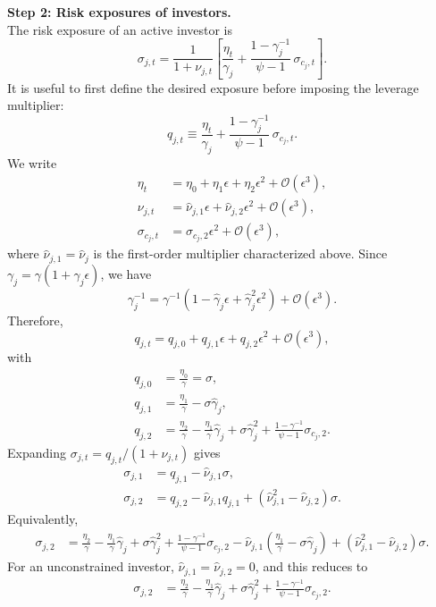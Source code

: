 \noindent\textbf{Step 2: Risk exposures of investors.}\\
The risk exposure of an active investor is
\begin{equation}
    \sigma_{j,t}
    = \frac{1}{1+\nu_{j,t}} \left[ \frac{\eta_t}{\gamma_j} + \frac{1-\gamma_j^{-1}}{\psi-1} \, \sigma_{c_j,t} \right].
\end{equation}
It is useful to first define the desired exposure before imposing the leverage multiplier:
\begin{equation}
    q_{j,t}
    \equiv \frac{\eta_t}{\gamma_j} + \frac{1-\gamma_j^{-1}}{\psi-1} \, \sigma_{c_j,t}.
\end{equation}
We write
\begin{align}
    \eta_t &= \eta_0 + \eta_1 \epsilon + \eta_2 \epsilon^2 + \mathcal{O}(\epsilon^3),\\
    \nu_{j,t} &= \hat{\nu}_{j,1}\epsilon + \hat{\nu}_{j,2}\epsilon^2 + \mathcal{O}(\epsilon^3),\\
    \sigma_{c_j,t} &= \sigma_{c_j,2}\epsilon^2 + \mathcal{O}(\epsilon^3),
\end{align}
where $\hat{\nu}_{j,1}=\hat{\nu}_j$ is the first-order multiplier characterized above.
Since $\gamma_j=\gamma(1+\hat{\gamma}_j\epsilon)$, we have
\begin{equation}
    \gamma_j^{-1}=\gamma^{-1}\left(1-\hat{\gamma}_j\epsilon+\hat{\gamma}_j^2\epsilon^2\right)+\mathcal{O}(\epsilon^3).
\end{equation}
Therefore,
\begin{equation}
    q_{j,t}=q_{j,0}+q_{j,1}\epsilon+q_{j,2}\epsilon^2+\mathcal{O}(\epsilon^3),
\end{equation}
with
\begin{align}
    q_{j,0} &= \frac{\eta_0}{\gamma}=\sigma,\\
    q_{j,1} &= \frac{\eta_1}{\gamma}-\sigma\hat{\gamma}_j,\\
    q_{j,2} &= \frac{\eta_2}{\gamma}-\frac{\eta_1}{\gamma}\hat{\gamma}_j+
    \sigma\hat{\gamma}_j^2+\frac{1-\gamma^{-1}}{\psi-1}\sigma_{c_j,2}.
\end{align}
Expanding $\sigma_{j,t}=q_{j,t}/(1+\nu_{j,t})$ gives
\begin{align}
    \sigma_{j,1} &= q_{j,1}-\hat{\nu}_{j,1}\sigma,\\
    \sigma_{j,2} &= q_{j,2}-\hat{\nu}_{j,1}q_{j,1}+
    \left(\hat{\nu}_{j,1}^2-\hat{\nu}_{j,2}\right)\sigma.
\end{align}
Equivalently,
\begin{align}\label{eq:sigma-j2-general}
    \sigma_{j,2}
    &= \frac{\eta_2}{\gamma}-\frac{\eta_1}{\gamma}\hat{\gamma}_j+
    \sigma\hat{\gamma}_j^2+\frac{1-\gamma^{-1}}{\psi-1}\sigma_{c_j,2}
    -\hat{\nu}_{j,1}\left(\frac{\eta_1}{\gamma}-\sigma\hat{\gamma}_j\right)
    +\left(\hat{\nu}_{j,1}^2-\hat{\nu}_{j,2}\right)\sigma.
\end{align}
For an unconstrained investor, $\hat{\nu}_{j,1}=\hat{\nu}_{j,2}=0$, and this reduces to
\begin{align}\label{eq:sigma-j2-unconstrained}
    \sigma_{j,2}
    &= \frac{\eta_2}{\gamma}-\frac{\eta_1}{\gamma}\hat{\gamma}_j+
    \sigma\hat{\gamma}_j^2+\frac{1-\gamma^{-1}}{\psi-1}\sigma_{c_j,2}.
\end{align}

